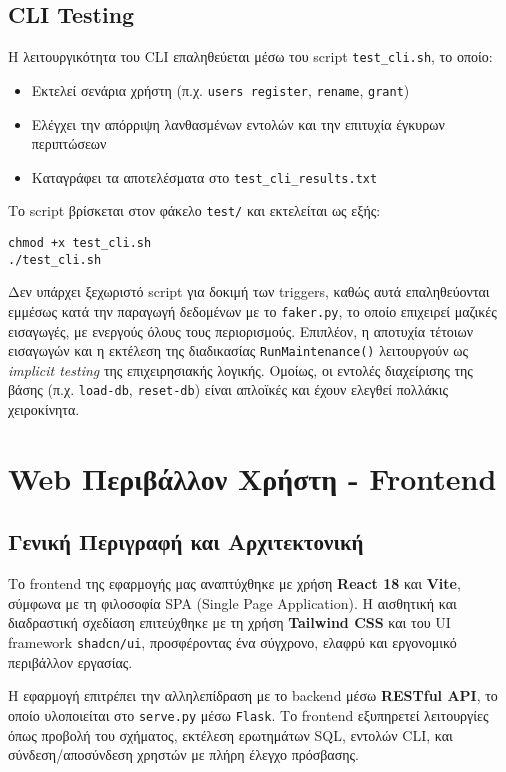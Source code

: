 \documentclass[13pt]{extarticle}
\begin{document}
\subsection{CLI Testing}

Η λειτουργικότητα του CLI επαληθεύεται μέσω του script \texttt{test\_cli.sh}, το οποίο:
\begin{itemize}
  \item Εκτελεί σενάρια χρήστη (π.χ. \texttt{users register}, \texttt{rename}, \texttt{grant})
  \item Ελέγχει την απόρριψη λανθασμένων εντολών και την επιτυχία έγκυρων περιπτώσεων
  \item Καταγράφει τα αποτελέσματα στο \texttt{test\_cli\_results.txt}
\end{itemize}

Το script βρίσκεται στον φάκελο \texttt{test/} και εκτελείται ως εξής:
\begin{verbatim}
chmod +x test_cli.sh
./test_cli.sh
\end{verbatim}

Δεν υπάρχει ξεχωριστό script για δοκιμή των triggers, καθώς αυτά επαληθεύονται εμμέσως κατά την παραγωγή δεδομένων με το \texttt{faker.py}, το οποίο επιχειρεί μαζικές εισαγωγές, με ενεργούς όλους τους περιορισμούς. Επιπλέον, η αποτυχία τέτοιων εισαγωγών και η εκτέλεση της διαδικασίας \texttt{RunMaintenance()} λειτουργούν ως \textit{implicit testing} της επιχειρησιακής λογικής. Ομοίως, οι εντολές διαχείρισης της βάσης (π.χ. \texttt{load-db}, \texttt{reset-db}) είναι απλοϊκές και έχουν ελεγθεί πολλάκις χειροκίνητα.


\clearpage
\section{Web Περιβάλλον Χρήστη - Frontend}

\subsection{Γενική Περιγραφή και Αρχιτεκτονική}

Το frontend της εφαρμογής μας αναπτύχθηκε με χρήση \textbf{React 18} και \textbf{Vite}, σύμφωνα με τη φιλοσοφία SPA (Single Page Application). Η αισθητική και διαδραστική σχεδίαση επιτεύχθηκε με τη χρήση \textbf{Tailwind CSS} και του UI framework \texttt{shadcn/ui}, προσφέροντας ένα σύγχρονο, ελαφρύ και εργονομικό περιβάλλον εργασίας.

Η εφαρμογή επιτρέπει την αλληλεπίδραση με το backend μέσω \textbf{RESTful API}, το οποίο υλοποιείται στο \texttt{serve.py} μέσω \texttt{Flask}. Το frontend εξυπηρετεί λειτουργίες όπως προβολή του σχήματος, εκτέλεση ερωτημάτων SQL, εντολών CLI, και σύνδεση/αποσύνδεση χρηστών με πλήρη έλεγχο πρόσβασης.
\end{document}
